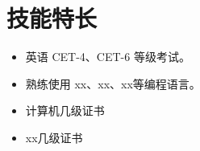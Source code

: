\documentclass[11pt]{article}
\newlength{\iconwidth}
\begin{document}
	\begin{minipage}[t]{\textwidth}
		\section[技能特长]{\normalsize\makebox[\iconwidth][c]{\color{primary_color}{\faWrench}}\quad 技能特长}
		\begin{itemize}
			\setlength{\itemsep}{0.5em}
			\item 英语 CET-4、CET-6 等级考试。
			\item 熟练使用 xx、xx、xx等编程语言。
			\item 计算机几级证书
			\item xx几级证书
		\end{itemize}
	\end{minipage}

	
	
	
	
\end{document}
